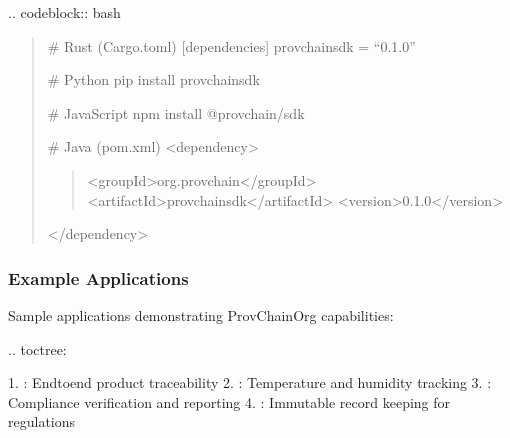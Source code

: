 \documentclass[letterpaper,10pt,english]{sphinxmanual}
\begin{document}
\sphinxAtStartPar
{}
.. code\sphinxhyphen{}block:: bash
\begin{quote}

\sphinxAtStartPar
\# Rust (Cargo.toml)
{[}dependencies{]}
provchain\sphinxhyphen{}sdk = “0.1.0”

\sphinxAtStartPar
\# Python
pip install provchain\sphinxhyphen{}sdk

\sphinxAtStartPar
\# JavaScript
npm install @provchain/sdk

\sphinxAtStartPar
\# Java (pom.xml)
\textless{}dependency\textgreater{}
\begin{quote}

\sphinxAtStartPar
\textless{}groupId\textgreater{}org.provchain\textless{}/groupId\textgreater{}
\textless{}artifactId\textgreater{}provchain\sphinxhyphen{}sdk\textless{}/artifactId\textgreater{}
\textless{}version\textgreater{}0.1.0\textless{}/version\textgreater{}
\end{quote}

\sphinxAtStartPar
\textless{}/dependency\textgreater{}
\end{quote}


\subsubsection{Example Applications}
\label{\detokenize{developer/index:example-applications}}
\sphinxAtStartPar
Sample applications demonstrating ProvChainOrg capabilities:

\sphinxAtStartPar
{}
.. toctree:

\begin{sphinxVerbatim}[commandchars=\\\{\}]
 
  

\end{sphinxVerbatim}

\sphinxAtStartPar
{}
1. : End\sphinxhyphen{}to\sphinxhyphen{}end product traceability
2. : Temperature and humidity tracking
3. : Compliance verification and reporting
4. : Immutable record keeping for regulations
\end{document}
